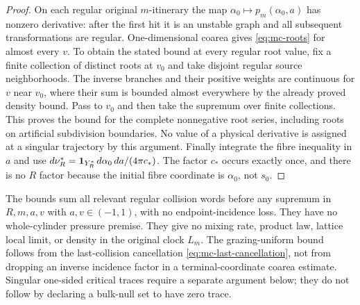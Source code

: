 \begin{proof}
On each regular original $m$-itinerary the map
$\alpha_0\mapsto p_m(\alpha_0,a)$ has nonzero derivative: after the
first hit it is an unstable graph and all subsequent transformations
are regular. One-dimensional coarea gives \eqref{eq:mc-roots} for
almost every $v$. To obtain the stated bound at every regular root
value, fix a finite collection of distinct roots at $v_0$ and take
disjoint regular source neighborhoods. The inverse branches and their
positive weights are continuous for $v$ near $v_0$, where their sum
is bounded almost everywhere by the already proved density bound.
Pass to $v_0$ and then take the supremum over finite collections.
This proves the bound for the complete nonnegative root series,
including roots on artificial subdivision boundaries. No value of a
physical derivative is assigned at a singular trajectory by this
argument. Finally integrate the fibre inequality in $a$ and use
$d\nu_R^*=\mathbf1_{Y_R^*}\,d\alpha_0\,da/(4\pi c_*)$.
The factor $c_*$ occurs exactly once, and there is no $R$ factor
because the initial fibre coordinate is $\alpha_0$, not $s_0$.
\end{proof}

\begin{remark}
\label{rem:mc-scope}
The bounds sum all relevant regular collision words before any supremum
in $R,m,a,v$ with $a,v\in(-1,1)$, with no endpoint-incidence loss. They have no
whole-cylinder pressure premise. They give no mixing rate, product
law, lattice local limit, or density in the original clock $L_m$.
The grazing-uniform bound follows from the last-collision cancellation
\eqref{eq:mc-last-cancellation}, not from dropping an inverse incidence
factor in a terminal-coordinate coarea estimate. Singular one-sided
critical traces require a separate argument below; they do not follow
by declaring a bulk-null set to have zero trace.
\end{remark}
